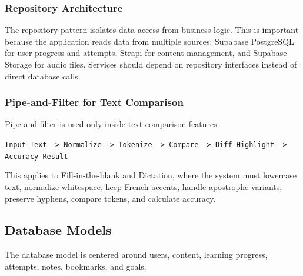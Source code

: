 \subsubsection{Repository Architecture}

The repository pattern isolates data access from business logic. This is important because the application reads data from multiple sources: Supabase PostgreSQL for user progress and attempts, Strapi for content management, and Supabase Storage for audio files. Services should depend on repository interfaces instead of direct database calls.

\subsubsection{Pipe-and-Filter for Text Comparison}

Pipe-and-filter is used only inside text comparison features.

\begin{center}
\texttt{Input Text -> Normalize -> Tokenize -> Compare -> Diff Highlight -> Accuracy Result}
\end{center}

This applies to Fill-in-the-blank and Dictation, where the system must lowercase text, normalize whitespace, keep French accents, handle apostrophe variants, preserve hyphens, compare tokens, and calculate accuracy.

\subsection{Database Models}

The database model is centered around users, content, learning progress, attempts, notes, bookmarks, and goals.

